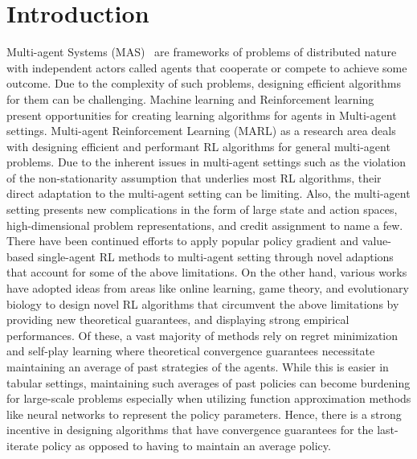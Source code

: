 \chapter{Introduction}

Multi-agent Systems (MAS)~\cite{tuylsMultiagent2012} are frameworks of problems of distributed
nature with independent actors called agents that cooperate or compete to achieve some outcome.
Due to the complexity of such problems, designing efficient algorithms for them can be challenging.
Machine learning and Reinforcement learning present opportunities for creating learning algorithms
for agents in Multi-agent settings.
Multi-agent Reinforcement Learning (MARL) as a research area deals with designing efficient and
performant RL algorithms for general multi-agent problems.
Due to the inherent issues in multi-agent settings such as the violation of the non-stationarity
assumption that underlies most RL algorithms, their direct adaptation to the multi-agent setting
can be limiting.
Also, the multi-agent setting presents new complications in the form of large state and action
spaces, high-dimensional problem representations, and credit assignment to name a few.
There have been continued efforts to apply popular policy gradient and value-based single-agent RL
methods to multi-agent setting through novel adaptions that account for some of the above
limitations.
On the other hand, various works have adopted ideas from areas like online learning, game theory,
and evolutionary biology to design novel RL algorithms that circumvent the above limitations by
providing new theoretical guarantees, and displaying strong empirical performances.
Of these, a vast majority of methods rely on regret minimization and self-play learning where
theoretical convergence guarantees necessitate maintaining an average of past strategies of the
agents.
While this is easier in tabular settings, maintaining such averages of past policies can become
burdening for large-scale problems especially when utilizing function approximation methods like
neural networks to represent the policy parameters.
Hence, there is a strong incentive in designing algorithms that have convergence guarantees for the
last-iterate policy as opposed to having to maintain an average policy.

